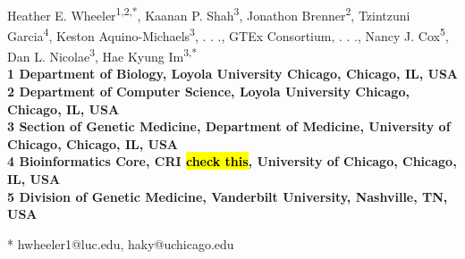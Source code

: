 \documentclass[10pt,letterpaper]{article}
\date{}
\begin{document}
\vspace*{0.35in}

\begin{flushleft}
{\Large
\textbf{}
}
\newline
\\
Heather E. Wheeler\textsuperscript{1,2,*},
Kaanan P. Shah\textsuperscript{3},
Jonathon Brenner\textsuperscript{2},
Tzintzuni Garcia\textsuperscript{4},
Keston Aquino-Michaels\textsuperscript{3},
. . .,
GTEx Consortium,
. . ., Nancy J. Cox\textsuperscript{5}, Dan L.
Nicolae\textsuperscript{3}, Hae Kyung Im\textsuperscript{3,*}
\\
\bigskip
\bf{1} Department of Biology, Loyola University Chicago, Chicago, IL, USA
\\
\bf{2} Department of Computer Science, Loyola University Chicago, Chicago, IL, USA
\\
\bf{3} Section of Genetic Medicine, Department of Medicine, University of Chicago, Chicago, IL, USA
\\
\bf{4} Bioinformatics Core, CRI \hl{check this},  University of Chicago, Chicago, IL, USA
\\
\bf{5} Division of Genetic Medicine, Vanderbilt University, Nashville, TN, USA
\bigskip

% 
%





* hwheeler1@luc.edu, haky@uchicago.edu

\end{flushleft}
\end{document}
